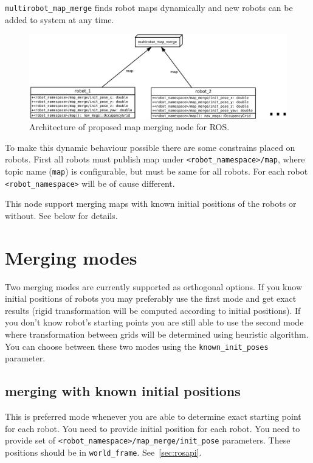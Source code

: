 \texttt{multirobot\_map\_merge} finds robot maps dynamically and new robots can be added to system at any time.

\begin{figure}
    \centering
    \includegraphics[width=\textwidth]{../img/map_merge_architecture.pdf}
    \caption{Architecture of proposed map merging node for \gls{ROS}.}
    \label{fig:mapmergearchitecture}
\end{figure}

To make this dynamic behaviour possible there are some constrains placed on robots. First all robots must publish map under \texttt{<robot\_namespace>/map}, where topic name (\texttt{map}) is configurable, but must be same for all robots. For each robot \texttt{<robot\_namespace>} will be of cause different.

This node support merging maps with known initial positions of the robots or without. See below for details.

\section{Merging modes}
\label{sec:mergingmodes}

Two merging modes are currently supported as orthogonal options. If you know initial positions of robots you may preferably use the first mode and get exact results (rigid transformation will be computed according to initial positions). If you don't know robot's starting points you are still able to use the second mode where transformation between grids will be determined using heuristic algorithm. You can choose between these two modes using the \texttt{known\_init\_poses} parameter.

\subsection{merging with known initial positions}

This is preferred mode whenever you are able to determine exact starting point for each robot. You need to provide initial position for each robot. You need to provide set of \texttt{<robot\_namespace>/map\_merge/init\_pose} parameters. These positions should be in \texttt{world\_frame}. See~\ref{sec:rosapi}.


